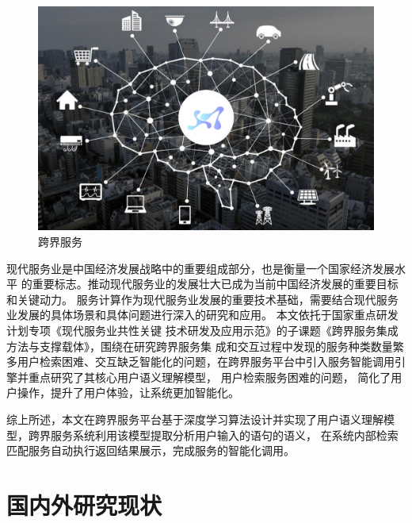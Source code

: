 \begin{figure}[htbp]
  \centering
  \includegraphics[scale=0.4]{./images/kuajiefuwu.png}
  \caption{跨界服务}
  \label{fig:kuajiefuwu}
\end{figure}


现代服务业是中国经济发展战略中的重要组成部分，也是衡量一个国家经济发展水平
的重要标志。推动现代服务业的发展壮大已成为当前中国经济发展的重要目标和关键动力\cite{唐任伍2012公共服务跨界合作}。
服务计算作为现代服务业发展的重要技术基础，需要结合现代服务业发展的具体场景和具体问题进行深入的研究和应用。
本文依托于国家重点研发计划专项《现代服务业共性关键
技术研发及应用示范》的子课题《跨界服务集成方法与支撑载体》，围绕在研究跨界服务集
成和交互过程中发现的服务种类数量繁多用户检索困难、交互缺乏智能化的问题，在跨界服务平台中引入服务智能调用引擎并重点研究了其核心用户语义理解模型，
用户检索服务困难的问题，
简化了用户操作，提升了用户体验，让系统更加智能化。

综上所述，本文在跨界服务平台基于深度学习算法设计并实现了用户语义理解模型，跨界服务系统利用该模型提取分析用户输入的语句的语义，
在系统内部检索匹配服务自动执行返回结果展示，完成服务的智能化调用。

\section{国内外研究现状}

